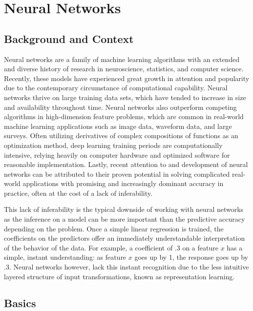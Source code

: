 \documentclass[12pt,twoside]{reedthesis}
\begin{document}
\section{Neural Networks}\label{neural-networks}

\subsection{Background and Context}\label{background-and-context}

Neural networks are a family of machine learning algorithms with an
extended and diverse history of research in neuroscience, statistics,
and computer science. Recently, these models have experienced great
growth in attention and popularity due to the contemporary circumstance
of computational capability. Neural networks thrive on large training
data sets, which have tended to increase in size and availability
throughout time. Neural networks also outperform competing algorithms in
high-dimension feature problems, which are common in real-world machine
learning applications such as image data, waveform data, and large
surveys. Often utilizing derivatives of complex compositions of
functions as an optimization method, deep learning training periods are
computationally intensive, relying heavily on computer hardware and
optimized software for reasonable implementation. Lastly, recent
attention to and development of neural networks can be attributed to
their proven potential in solving complicated real-world applications
with promising and increasingly dominant accuracy in practice, often at
the cost of a lack of inferability.

This lack of inferability is the typical downside of working with neural
networks as the inference on a model can be more important than the
predictive accuracy depending on the problem. Once a simple linear
regression is trained, the coefficients on the predictors offer an
immediately understandable interpretation of the behavior of the data.
For example, a coefficient of .3 on a feature \(x\) has a simple,
instant understanding: as feature \(x\) goes up by 1, the response goes
up by .3. Neural networks however, lack this instant recognition due to
the less intuitive layered structure of input transformations, known as
representation learning.

\subsection{Basics}\label{basics}
\end{document}
